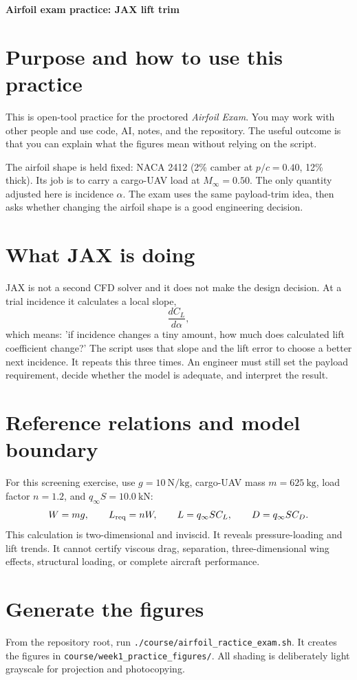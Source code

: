 \documentclass[11pt]{article}
\begin{document}
\begin{center}\textbf{Airfoil exam practice: JAX lift trim}\end{center}

\section*{Purpose and how to use this practice}
This is open-tool practice for the proctored \emph{Airfoil Exam}. You may work with other people and use code, AI, notes, and the repository. The useful outcome is that you can explain what the figures mean without relying on the script.

The airfoil shape is held fixed: NACA 2412 (2\% camber at $p/c=0.40$, 12\% thick). Its job is to carry a cargo-UAV load at $M_\infty=0.50$. The only quantity adjusted here is incidence $\alpha$. The exam uses the same payload-trim idea, then asks whether changing the airfoil shape is a good engineering decision.

\section*{What JAX is doing}
JAX is not a second CFD solver and it does not make the design decision. At a trial incidence it calculates a local slope,
\[
  \frac{dC_L}{d\alpha},
\]
which means: 'if incidence changes a tiny amount, how much does calculated lift coefficient change?' The script uses that slope and the lift error to choose a better next incidence. It repeats this three times. An engineer must still set the payload requirement, decide whether the model is adequate, and interpret the result.

\section*{Reference relations and model boundary}
For this screening exercise, use $g=10\ \mathrm{N/kg}$, cargo-UAV mass $m=625\ \mathrm{kg}$, load factor $n=1.2$, and $q_\infty S=10.0\ \mathrm{kN}$:
\[
 W=mg,\qquad L_{\rm req}=nW,\qquad L=q_\infty S C_L,\qquad D=q_\infty S C_D.
\]
This calculation is two-dimensional and inviscid. It reveals pressure-loading and lift trends. It cannot certify viscous drag, separation, three-dimensional wing effects, structural loading, or complete aircraft performance.

\section*{Generate the figures}
From the repository root, run \texttt{./course/airfoil\_ractice\_exam.sh}. It creates the figures in \texttt{course/week1\_practice\_figures/}. All shading is deliberately light grayscale for projection and photocopying.
\end{document}
